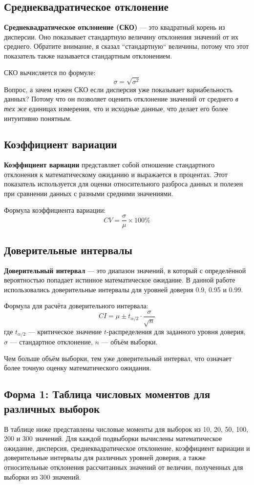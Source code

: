 \subsection{Среднеквадратическое отклонение}
\textbf{Среднеквадратическое отклонение (СКО)} — это квадратный корень из дисперсии. Оно показывает стандартную величину отклонения значений от их среднего. Обратите внимание, я сказал ``стандартную`` величины, потому что этот показатель также называется стандартным отклонением.

СКО вычисляется по формуле:
\[
	\sigma = \sqrt{\sigma^2}
\]
Вопрос, а зачем нужен СКО если дисперсия уже показывает вариабельность данных? Потому что он позволяет оценить отклонение значений от среднего \textit{в тех же} единицах измерения, что и исходные данные, что делает его более интуитивно понятным.

\subsection{Коэффициент вариации}
\textbf{Коэффициент вариации} представляет собой отношение стандартного отклонения к математическому ожиданию и выражается в процентах. Этот показатель используется для оценки относительного разброса данных и полезен при сравнении данных с разными средними значениями.

Формула коэффициента вариации:
\[
	CV = \frac{\sigma}{\mu} \times 100\%
\]

\subsection{Доверительные интервалы}
\textbf{Доверительный интервал} — это диапазон значений, в который с определённой вероятностью попадает истинное математическое ожидание. В данной работе использовались доверительные интервалы для уровней доверия 0.9, 0.95 и 0.99.

Формула для расчёта доверительного интервала:
\[
	CI = \mu \pm t_{\alpha/2} \cdot \frac{\sigma}{\sqrt{n}}
\]
где $t_{\alpha/2}$ — критическое значение $t$-распределения для заданного уровня доверия, $\sigma$ — стандартное отклонение, $n$ — объём выборки.

Чем больше объём выборки, тем уже доверительный интервал, что означает более точную оценку математического ожидания.

\subsection{Форма 1: Таблица числовых моментов для различных выборок}
В таблице ниже представлены числовые моменты для выборок из 10, 20, 50, 100, 200 и 300 значений. Для каждой подвыборки вычислены математическое ожидание, дисперсия, среднеквадратическое отклонение, коэффициент вариации и доверительные интервалы для различных уровней доверия, а также относительные отклонения рассчитанных значений от величин, полученных для выборки из 300 значений.

